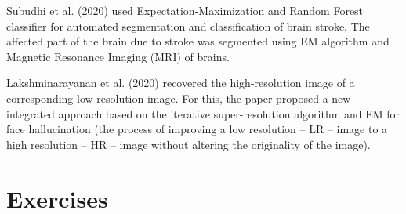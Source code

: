 Subudhi et al. (2020) \cite{subudhi2020automated} used Expectation-Maximization and Random Forest classifier for automated segmentation and classification of brain stroke. The affected part of the brain due to stroke was segmented using EM algorithm and Magnetic Resonance Imaging (MRI) of brains. %


Lakshminarayanan et al. (2020) \cite{lakshminarayanan2020new} recovered the high-resolution image of a corresponding low-resolution image. For this, the paper proposed a new integrated approach based on the iterative super-resolution algorithm and EM for face hallucination (the process of improving a low resolution -- LR -- image to a high resolution -- HR -- image without altering the originality of the image). %


\section{Exercises}

